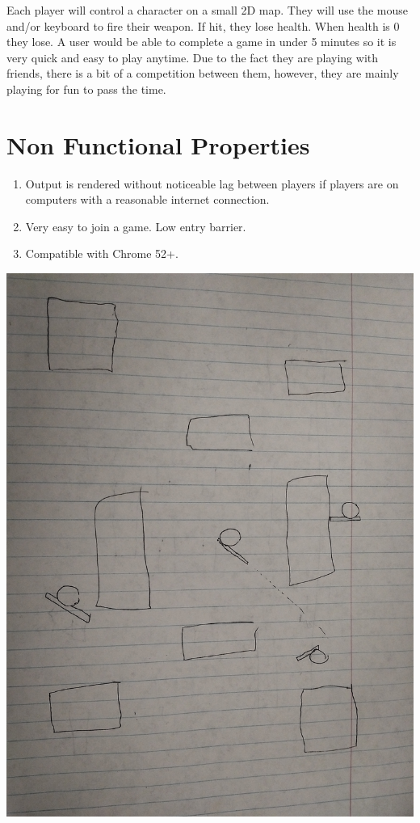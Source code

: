 \documentclass[11pt, oneside]{article}   	%
\begin{document}
Each player will control a character on a small 2D map. They will use the mouse and/or keyboard to fire their weapon. If hit, they lose health. When health is 0 they lose. A user would be able to complete a game in under 5 minutes so it is very quick and easy to play anytime. Due to the fact they are playing with friends, there is a bit of a competition between them, however, they are mainly playing for fun to pass the time.  \\



\section{Non Functional Properties} 
\begin{enumerate}
\item Output is rendered without noticeable lag between players if players are on computers with a reasonable internet connection. 
\item Very easy to join a game. Low entry barrier. 
\item Compatible with Chrome 52+.
\end{enumerate}


\clearpage

\includegraphics[scale=.09]{mockup.jpg}
\end{document}
